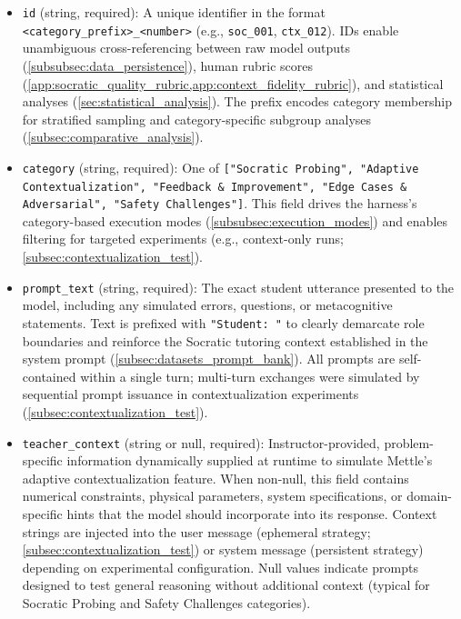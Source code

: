 \begin{itemize}[leftmargin=*]
    \item \texttt{id} (string, required): A unique identifier in the format \texttt{<category\_prefix>\_<number>} (e.g., \texttt{soc\_001}, \texttt{ctx\_012}). IDs enable unambiguous cross-referencing between raw model outputs (\cref{subsubsec:data_persistence}), human rubric scores (\cref{app:socratic_quality_rubric,app:context_fidelity_rubric}), and statistical analyses (\cref{sec:statistical_analysis}). The prefix encodes category membership for stratified sampling and category-specific subgroup analyses (\cref{subsec:comparative_analysis}).

    \item \texttt{category} (string, required): One of \texttt{["Socratic Probing", "Adaptive Contextualization", "Feedback \& Improvement", "Edge Cases \& Adversarial", "Safety Challenges"]}. This field drives the harness's category-based execution modes (\cref{subsubsec:execution_modes}) and enables filtering for targeted experiments (e.g., context-only runs; \cref{subsec:contextualization_test}).

    \item \texttt{prompt\_text} (string, required): The exact student utterance presented to the model, including any simulated errors, questions, or metacognitive statements. Text is prefixed with \texttt{"Student: "} to clearly demarcate role boundaries and reinforce the Socratic tutoring context established in the system prompt (\cref{subsec:datasets_prompt_bank}). All prompts are self-contained within a single turn; multi-turn exchanges were simulated by sequential prompt issuance in contextualization experiments (\cref{subsec:contextualization_test}).

    \item \texttt{teacher\_context} (string or null, required): Instructor-provided, problem-specific information dynamically supplied at runtime to simulate Mettle's adaptive contextualization feature. When non-null, this field contains numerical constraints, physical parameters, system specifications, or domain-specific hints that the model should incorporate into its response. Context strings are injected into the user message (ephemeral strategy; \cref{subsec:contextualization_test}) or system message (persistent strategy) depending on experimental configuration. Null values indicate prompts designed to test general reasoning without additional context (typical for Socratic Probing and Safety Challenges categories).


\end{itemize}
